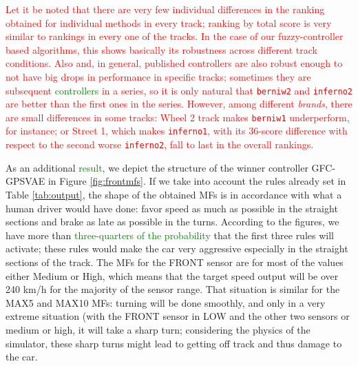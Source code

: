 \documentclass[10pt,journal,compsoc]{IEEEtran}
\begin{document}
\textcolor{red}{Let it be noted that there are very few individual
  differences in the ranking obtained for individual methods in every
  track; ranking by total score is very similar to rankings in every
  one of the tracks. In the case of our fuzzy-controller based
  algorithms, this shows basically its robustness across different
  track conditions. Also and, in general, published controllers are also robust
  enough to not have big drops in performance in specific
  tracks; sometimes they are subsequent \textcolor{green}{controllers} in a series, so
  it is only natural that {\tt berniw2} and {\tt inferno2} are better
  than the first ones in the series. However, among different {\em
    brands}, there are small differences in some tracks: {\sf
    Wheel 2} track makes {\tt berniw1} underperform, for instance; or
  {\sf Street 1}, which makes {\tt inferno1}, with its 36-score
  difference with respect to the second worse {\tt inferno2}, fall to
  last in the overall rankings.}


As an additional \textcolor{green}{result}, we depict the structure of the winner controller {\sf GFC-GPSVAE} in Figure \ref{fig:frontmfs}. 
If we take into account the rules already set in Table
\ref{tab:output}, the shape of the obtained MFs  is in accordance with
what a human driver would have done: favor speed as much as possible
in the straight sections and brake as late as possible in the turns. 
According to the figures, we have more than \textcolor{green}{three-quarters of the probability} that the first three rules will activate; these rules
would make the car very aggressive especially in the straight sections
of the track. The MFs for the FRONT sensor are for most of the values
either Medium or High, which means that the target speed output will
be over 240 km/h for the majority of the sensor range. 
That situation is similar for the MAX5 and MAX10 MFs: turning will be done smoothly, and only in a very extreme situation (with the FRONT sensor in LOW and
the other two sensors or medium or high, it will take a sharp turn;
considering the physics of the simulator, these sharp turns might lead
to getting off track and thus damage to the car.
\end{document}
